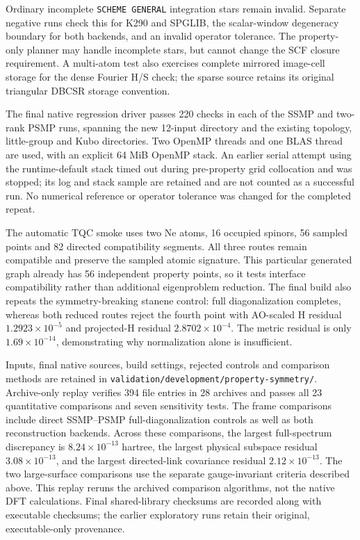 \documentclass[11pt]{article}
\begin{document}
Ordinary incomplete \texttt{SCHEME GENERAL} integration stars
remain invalid. Separate negative runs check this for K290 and
SPGLIB, the scalar-window degeneracy boundary for both backends,
and an invalid operator tolerance. The property-only planner
may handle incomplete stars, but cannot change the SCF closure
requirement. A multi-atom test also exercises complete mirrored
image-cell storage for the dense Fourier H/S check; the sparse
source retains its original triangular DBCSR storage convention.

The final native regression driver passes 220 checks in each of the
SSMP and two-rank PSMP runs, spanning the new 12-input directory and
the existing topology, little-group and Kubo directories. Two OpenMP
threads and one BLAS thread are used, with an explicit 64 MiB OpenMP
stack. An earlier serial attempt using the runtime-default stack
timed out during pre-property grid collocation and was stopped; its
log and stack sample are retained and are not counted as a successful
run. No numerical reference or operator tolerance was changed for
the completed repeat.

The automatic TQC smoke uses two Ne atoms, 16 occupied spinors, 56
sampled points and 82 directed compatibility segments. All three
routes remain compatible and preserve the sampled atomic signature.
This particular generated graph already has 56 independent property
points, so it tests interface compatibility rather than additional
eigenproblem reduction. The final build also repeats the
symmetry-breaking stanene control: full diagonalization completes,
whereas both reduced routes reject the fourth point with
AO-scaled H residual $1.2923\times10^{-5}$ and projected-H residual
$2.8702\times10^{-4}$. The metric residual is only
$1.69\times10^{-14}$, demonstrating why normalization alone is
insufficient.

Inputs, final native sources, build settings, rejected controls and
comparison methods are retained in
\nolinkurl{validation/development/property-symmetry/}.
Archive-only replay verifies 394 file entries in 28 archives and
passes all 23 quantitative comparisons and seven sensitivity tests.
The frame comparisons include direct SSMP--PSMP full-diagonalization
controls as well as both reconstruction backends. Across these
comparisons, the largest full-spectrum discrepancy is
$8.24\times10^{-13}$ hartree, the largest physical subspace residual
$3.08\times10^{-13}$, and the largest directed-link covariance
residual $2.12\times10^{-13}$. The two large-surface comparisons use
the separate gauge-invariant criteria described above.
This replay reruns the archived comparison algorithms, not the native
DFT calculations. Final shared-library checksums are recorded along
with executable checksums; the earlier exploratory runs retain their
original, executable-only provenance.
\end{document}
